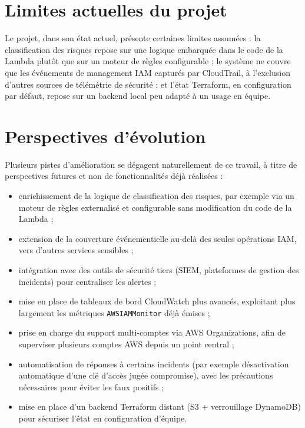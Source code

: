 \documentclass[11pt,a4paper]{report}
\begin{document}
\section{Limites actuelles du projet}

Le projet, dans son état actuel, présente certaines limites assumées : la classification des risques repose sur une logique embarquée dans le code de la Lambda plutôt que sur un moteur de règles configurable ; le système ne couvre que les événements de management IAM capturés par CloudTrail, à l'exclusion d'autres sources de télémétrie de sécurité ; et l'état Terraform, en configuration par défaut, repose sur un backend local peu adapté à un usage en équipe.

\section{Perspectives d'évolution}

Plusieurs pistes d'amélioration se dégagent naturellement de ce travail, à titre de perspectives futures et non de fonctionnalités déjà réalisées :

\begin{itemize}[leftmargin=1.4em]
  \item enrichissement de la logique de classification des risques, par exemple via un moteur de règles externalisé et configurable sans modification du code de la Lambda ;
  \item extension de la couverture événementielle au-delà des seules opérations IAM, vers d'autres services sensibles ;
  \item intégration avec des outils de sécurité tiers (SIEM, plateformes de gestion des incidents) pour centraliser les alertes ;
  \item mise en place de tableaux de bord CloudWatch plus avancés, exploitant plus largement les métriques \texttt{AWSIAMMonitor} déjà émises ;
  \item prise en charge du support multi-comptes via AWS Organizations, afin de superviser plusieurs comptes AWS depuis un point central ;
  \item automatisation de réponses à certains incidents (par exemple désactivation automatique d'une clé d'accès jugée compromise), avec les précautions nécessaires pour éviter les faux positifs ;
  \item mise en place d'un backend Terraform distant (S3 + verrouillage DynamoDB) pour sécuriser l'état en configuration d'équipe.
\end{itemize}
\end{document}
